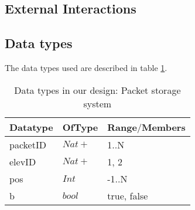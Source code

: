 \subsection*{External Interactions}


\subsection*{Data types}
The data types used are described in table \ref{tab: data_types}.
\begin{table}[ht]
\centering
\begin{tabular}{|l|l|l|}\hline
Datatype & OfType & Range$\slash$Members\\\hline
packetID & $Nat+$ & {1..N} \\\hline
elevID & $Nat+$ & {1, 2}\\\hline
pos & $Int$ & {-1..N}\\\hline
b & $bool$ & {true, false} \\\hline
\end{tabular}
\caption{Data types in our design: Packet storage system }
\label{tab: data_types}
\end{table}


